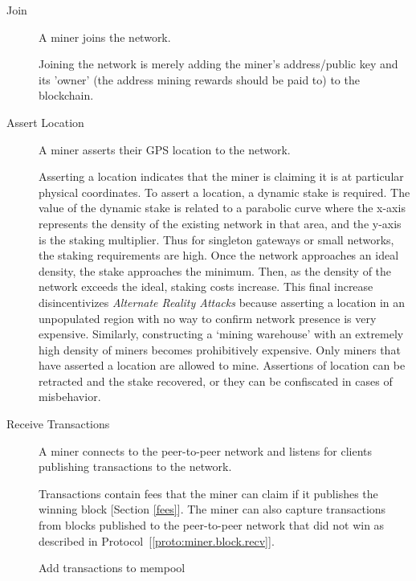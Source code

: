\documentclass[10pt, nonatbib, nocopyrightspace, reprint]{sigplanconf}
\begin{document}
\begin{description}
  \item [Join] A miner joins the network.

    Joining the network is merely adding the miner's address/public key and its 'owner' (the address mining rewards should be paid to) to the blockchain.

  \item [Assert Location] A miner asserts their GPS location to the network.

    Asserting a location indicates that the miner is claiming it is at particular physical coordinates. To assert a location, a dynamic stake is required. The value of the dynamic stake is related to a parabolic curve where the x-axis represents the density of the existing network in that area, and the y-axis is the staking multiplier. Thus for singleton gateways or small networks, the staking requirements are high.  Once the network approaches an ideal density, the stake approaches the minimum. Then, as the density of the network exceeds the ideal, staking costs increase. This final increase disincentivizes \emph{Alternate Reality Attacks} because asserting a location in an unpopulated region with no way to confirm network presence is very expensive. Similarly, constructing a `mining warehouse' with an extremely high density of miners becomes prohibitively expensive. Only miners that have asserted a location are allowed to mine. Assertions of location can be retracted and the stake recovered, or they can be confiscated in cases of misbehavior.

  \item [Receive Transactions] A miner connects to the peer-to-peer network and listens for clients publishing transactions to the network.

    Transactions contain fees that the miner can claim if it publishes the winning block [Section \ref{fees}]. The miner can also capture transactions from blocks published to the peer-to-peer network that did not win as described in Protocol~[\ref{proto:miner.block.recv}].

    \begin{algorithm}[!htb]
      \DontPrintSemicolon
      \caption{Miner Receive Transactions}\label{proto:miner.trans.recv}

       {
        Add transactions to mempool\;
      }
    \end{algorithm}
    \FloatBarrier


\end{description}
\end{document}
